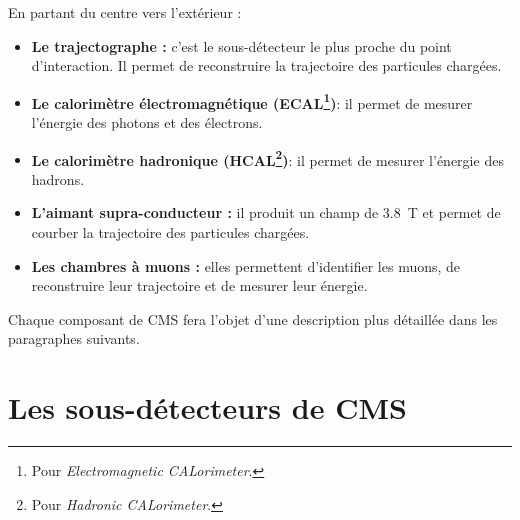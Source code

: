 \newpage
En partant du centre vers l'extérieur :
\begin{itemize}[label=$\bullet$]
	\item \textbf{Le trajectographe : } c'est le sous-détecteur le plus proche du point d'interaction. Il permet de reconstruire la trajectoire des particules chargées.
	 \item \textbf{Le calorimètre électromagnétique (ECAL\footnote{Pour \textit{Electromagnetic CALorimeter}.})}: il permet de mesurer l'énergie des photons et des électrons.
	 \item \textbf{Le calorimètre hadronique (HCAL\footnote{Pour \textit{Hadronic CALorimeter}.})}: il permet de mesurer l'énergie des hadrons.
	 \item \textbf{L'aimant supra-conducteur : } il produit un champ de \SI{3.8}{\tesla} et permet de courber la trajectoire des particules chargées.
	 \item \textbf{Les chambres à muons : } elles permettent d'identifier les muons, de reconstruire leur trajectoire et de mesurer leur énergie. 
\end{itemize}
Chaque composant de CMS fera l'objet d'une description plus détaillée dans les paragraphes suivants.

\section{Les sous-détecteurs de CMS}
